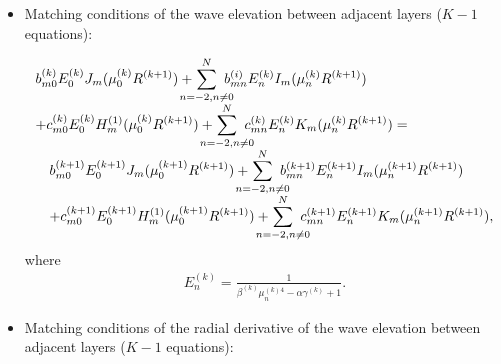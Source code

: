 \documentclass{jfm}
\begin{document}
\begin{itemize}
  \item 
Matching conditions of the wave elevation between adjacent layers ($K-1$ equations):

\begin{eqnarray}
\begin{array}{l}
\displaystyle b_{m0}^{(k)}E_0^{(k)}J_m(\mu^{(k)}_0 R^{(k+1)})+ \hspace{-4mm} \sum_{n=-2,n\ne 0}^{N}\hspace{-3mm} b^{(i)}_{mn} E_n^{(k)}I_m(\mu^{(k)}_n R^{(k+1)})\\
\displaystyle +c_{m0}^{(k)}E_0^{(k)}H_m^{(1)}(\mu^{(k)}_0 R^{(k+1)}) +\hspace{-4mm} \sum_{n=-2,n\ne 0}^{N}\hspace{-3mm} c^{(k)}_{mn}E_n^{(k)} K_m(\mu^{(k)}_n R^{(k+1)}) =\\
\displaystyle \quad b_{m0}^{(k+1)}E_0^{(k+1)}J_m(\mu^{(k+1)}_0 R^{(k+1)})+ \hspace{-4mm} \sum_{n=-2,n\ne 0}^{N}\hspace{-3mm} b^{(k+1)}_{mn} E_n^{(k+1)}I_m(\mu^{(k+1)}_n R^{(k+1)})  \\
\displaystyle \quad +c_{m0}^{(k+1)}E_0^{(k+1)}H_m^{(1)}(\mu^{(k+1)}_0 R^{(k+1)}) +\hspace{-4mm} \sum_{n=-2,n\ne 0}^{N}\hspace{-3mm} c^{(k+1)}_{mn}E_n^{(k+1)} K_m(\mu^{(k+1)}_n R^{(k+1)}),
\end{array}
\end{eqnarray}
where
\begin{eqnarray}
\displaystyle E_n^{(k)}=\frac{1}{\beta^{(k)}\mu_n^{(k)4}-\alpha \gamma^{(k)}+1}.\nonumber
\end{eqnarray}

  \item 
Matching conditions of the radial derivative of the wave elevation between adjacent layers ($K-1$ equations):


\end{itemize}
\end{document}
